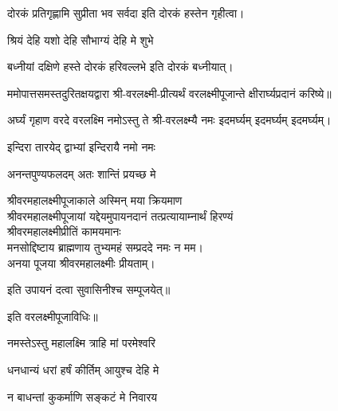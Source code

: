 \begin{center}
{दोरकं प्रतिगृह्णामि सुप्रीता भव सर्वदा} 
इति दोरकं हस्तेन गृहीत्वा।


{श्रियं देहि यशो देहि सौभाग्यं देहि मे शुभे}

{बध्नीयां दक्षिणे हस्ते दोरकं हरिवल्लभे}
इति दोरकं बध्नीयात्।


ममोपात्तसमस्तदुरितक्षयद्वारा श्री-वरलक्ष्मी-प्रीत्यर्थं वरलक्ष्मीपूजान्ते क्षीरार्घ्यप्रदानं करिष्ये॥

{अर्घ्यं गृहाण वरदे वरलक्ष्मि नमोऽस्तु ते} 
श्री-वरलक्ष्म्यै नमः इदमर्घ्यम् इदमर्घ्यम् इदमर्घ्यम्।


{इन्दिरा तारयेद् द्वाभ्यां इन्दिरायै नमो नमः}

{अनन्तपुण्यफलदम् अतः शान्तिं प्रयच्छ मे}

श्रीवरमहालक्ष्मीपूजाकाले अस्मिन् मया क्रियमाण\\
श्रीवरमहालक्ष्मीपूजायां यद्देयमुपायनदानं तत्प्रत्यायाम्नार्थं हिरण्यं\\
श्रीवरमहालक्ष्मीप्रीतिं कामयमानः\\
मनसोद्दिष्टाय ब्राह्मणाय तुभ्यमहं सम्प्रददे नमः न मम।\\ 
अनया पूजया श्रीवरमहालक्ष्मीः प्रीयताम्। 

इति उपायनं दत्वा सुवासिनीश्च सम्पूजयेत्॥


इति वरलक्ष्मीपूजाविधिः॥

\end{center}





{नमस्तेऽस्तु महालक्ष्मि त्राहि मां परमेश्वरि}

{धनधान्यं धरां हर्षं कीर्तिम् आयुश्च देहि मे}

{न बाधन्तां कुकर्माणि सङ्कटं मे निवारय}





